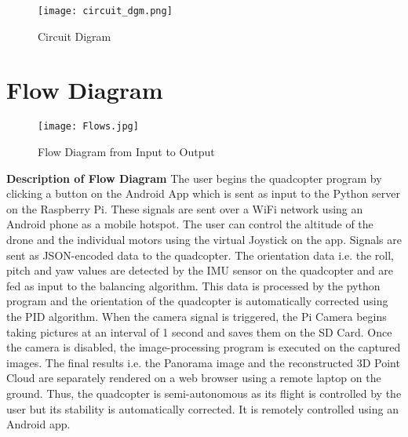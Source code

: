\begin{figure}[H]
  \centering
  \texttt{[image: circuit\_dgm.png]}
  \caption{Circuit Digram}
  \label{circuit} 
\end{figure}


\section{Flow Diagram}
\begin{figure}[H]
  \centering
  \texttt{[image: Flows.jpg]}
  \caption{Flow Diagram from Input to Output}
  \label{Flow}	
\end{figure}

\textbf{Description of Flow Diagram}
\newline
The user begins the quadcopter program by clicking a button on the Android App which is sent as input to the Python server on the Raspberry Pi. These signals are sent over a WiFi network using an Android phone as a mobile hotspot. The user can control the altitude of the drone and the individual motors using the virtual Joystick on the app. Signals are sent as JSON-encoded data to the quadcopter. The orientation data i.e. the roll, pitch and yaw values are detected by the IMU sensor on the quadcopter and are fed as input to the balancing algorithm. This data is processed by the python program and the orientation of the quadcopter is automatically corrected using the PID algorithm. When the camera signal is triggered, the Pi Camera begins taking pictures at an interval of 1 second and saves them on the SD Card. Once the camera is disabled, the image-processing program is executed on the captured images. The final results i.e. the Panorama image and the reconstructed 3D Point Cloud are separately rendered on a web browser using a remote laptop on the ground. Thus, the quadcopter is semi-autonomous as its flight is controlled by the user but its stability is automatically corrected. It is remotely controlled using an Android app.



